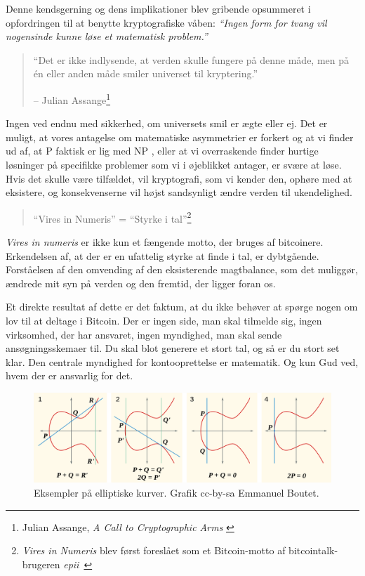 \documentclass[paper=6in:9in,pagesize=pdftex,
               headinclude=on,footinclude=on,12pt]{scrbook}
\begin{document}
Denne kendsgerning og dens implikationer blev gribende opsummeret i opfordringen til at benytte kryptografiske våben: \textit{\enquote{Ingen form for tvang vil nogensinde kunne løse et matematisk problem.}}\begin{quotation}\begin{samepage} \enquote{Det er ikke indlysende, at verden skulle fungere på denne måde, men på \'en eller anden måde smiler universet til kryptering.} \begin{flushright} -- Julian Assange\footnote{Julian Assange, \textit{A Call to Cryptographic Arms} \cite{call-to-cryptographic-arms}}
\end{flushright}\end{samepage}\end{quotation}

Ingen ved endnu med sikkerhed, om universets smil er ægte eller ej. Det er muligt, at vores antagelse om matematiske asymmetrier er forkert og at vi finder ud af, at P faktisk er lig med NP \cite{wiki:pnp}, eller at vi overraskende finder hurtige løsninger på specifikke problemer \cite{wiki:discrete-log} som vi i øjeblikket antager, er svære at løse. Hvis det skulle være tilfældet, vil kryptografi, som vi kender den, ophøre med at eksistere, og konsekvenserne vil højst sandsynligt ændre verden til ukendelighed.\begin{quotation}\begin{samepage} \enquote{Vires in Numeris} = \enquote{Styrke i tal}\footnote{\textit{Vires in Numeris} blev først foreslået som et Bitcoin-motto af bitcointalk-brugeren \textit{epii}~\cite{epii}}
\end{samepage}\end{quotation}

\textit{Vires in numeris} er ikke kun et fængende motto, der bruges af bitcoinere. Erkendelsen af, at der er en ufattelig styrke at finde i tal, er dybtgående. Forståelsen af den omvending af den eksisterende magtbalance, som det muliggør, ændrede mit syn på verden og den fremtid, der ligger foran os.

Et direkte resultat af dette er det faktum, at du ikke behøver at spørge nogen om lov til at deltage i Bitcoin. Der er ingen side, man skal tilmelde sig, ingen virksomhed, der har ansvaret, ingen myndighed, man skal sende ansøgningsskemaer til. Du skal blot generere et stort tal, og så er du stort set klar. Den centrale myndighed for kontooprettelse er matematik. Og kun Gud ved, hvem der er ansvarlig for det.\begin{figure}
  \includegraphics{assets/images/elliptic-curve-examples.png}
  \caption{Eksempler på elliptiske kurver. Grafik cc-by-sa Emmanuel Boutet.}
  \label{fig:elliptic-curve-examples}
\end{figure}
\end{document}
